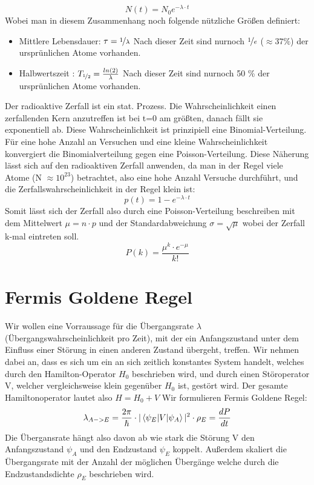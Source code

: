 \documentclass[Ex4_Zusammenfassung.tex]{subfiles}
\begin{document}
\begin{itemize}
\begin{equation}
N(t) = N_{0} e^{-\lambda \cdot t}
\end{equation}  \newpage
Wobei man in diesem Zusammenhang noch folgende nützliche Größen definiert: 
\begin{itemize}
\item Mittlere Lebensdauer: $ \tau = \nicefrac{1}{\lambda} $ \newline 
Nach dieser Zeit sind nurnoch $\nicefrac{1}{e} $ ($ \approx 37 \% $) der ursprünlichen Atome vorhanden.
\item Halbwertszeit : $ T_{\nicefrac{1}{2}} = \frac{ln(2)}{\lambda} $
Nach dieser Zeit sind nurnoch 50 \% der ursprünlichen Atome vorhanden.
\end{itemize}
\end{itemize}
Der radioaktive Zerfall ist ein stat. Prozess. Die Wahrscheinlichkeit einen zerfallenden Kern anzutreffen ist bei t=0 am größten, danach fällt sie exponentiell ab. 
Diese Wahrscheinlichkeit ist prinzipiell eine Binomial-Verteilung. Für eine hohe Anzahl an Versuchen und eine kleine Wahrscheinlichkeit konvergiert die Binomialverteilung gegen eine Poisson-Verteilung. Diese Näherung lässt sich auf den radioaktiven Zerfall anwenden, da man in der Regel viele Atome (N $\approx 10^{23} $) betrachtet, also eine hohe Anzahl Versuche durchführt, und die Zerfallswahrscheinlichkeit in der Regel klein ist: 
\begin{equation}
p(t) = 1 - e^{-\lambda \cdot t} 
\end{equation}
Somit lässt sich der Zerfall also durch eine Poisson-Verteilung beschreiben mit dem Mittelwert $ \mu = n\cdot p $ und der Standardabweichung  $ \sigma = \sqrt{\mu} $ wobei der Zerfall k-mal eintreten soll. 
\begin{equation}
P(k) = \frac{\mu^k \cdot e^{-\mu} } {k!} 
\end{equation}

\section{Fermis Goldene Regel}
Wir wollen eine Vorraussage für die Übergangsrate $ \lambda $ (Übergangswahrscheinlichkeit pro Zeit), mit der ein Anfangszustand unter dem Einfluss einer Störung in einen anderen Zustand übergeht, treffen. Wir nehmen dabei an, dass es sich um ein an sich zeitlich konstantes System handelt, welches durch den Hamilton-Operator $ H_0 $ beschrieben wird, und durch einen Störoperator V, welcher vergleichsweise klein gegenüber  $ H_0 $ ist, gestört wird. Der gesamte Hamiltonoperator lautet also $ H = H_0 + V $ \newline
Wir formulieren Fermis Goldene Regel: 
\begin{equation}
\lambda_{A->E} = \frac{2\pi}{\hslash} \cdot |\braket{\psi_{E} | V |\psi_{A}}|^2 \cdot \rho_{E} = \frac{dP}{dt}
\end{equation}
Die Übergansrate hängt also davon ab wie stark die Störung V den Anfangszustand $ \psi_A $ und den Endzustand $ \psi_E $ koppelt. Außerdem skaliert die Übergangsrate mit der Anzahl der möglichen Übergänge welche durch die Endzustandsdichte $ \rho_{E} $ beschrieben wird. \newpage 
\end{document}

